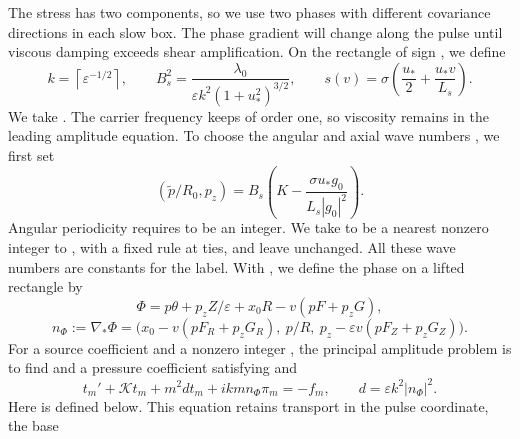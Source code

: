 The stress has two components, so we use two phases with different covariance directions
in each slow box. The phase gradient will change along the pulse until viscous damping
exceeds shear amplification. On the rectangle of sign , we define
\begin{equation}
k=\left\lceil\varepsilon^{-1/2}\right\rceil,\qquad
B_s^2=\frac{\lambda_0}{\varepsilon k^2(1+u_*^2)^{3/2}},\qquad
s(v)=\sigma\left(\frac{u_*}{2}+\frac{u_*v}{L_s}\right).
\tag{7.2}\label{eq:7.2}
\end{equation}
We take . The carrier frequency  keeps  of order one, so viscosity remains in the
leading amplitude equation. To choose the angular and axial wave numbers , we first set
\[
(\widetilde p/R_0,p_z)=B_s\left(K-\frac{\sigma u_*g_0}{L_s|g_0|^2}\right).
\]
Angular periodicity requires  to be an integer. We take  to be a nearest nonzero integer
to , with a fixed rule at ties, and leave  unchanged. All these wave numbers are constants
for the label. With , we define the phase on a lifted rectangle by
\begin{equation}
\Phi=p\theta+p_zZ/\varepsilon+x_0R-v(pF+p_zG),
\tag{7.3}\label{eq:7.3}
\end{equation}
\begin{equation}
n_\Phi:=\nabla_*\Phi=\bigl(x_0-v(pF_R+p_zG_R),\ p/R,\ p_z-\varepsilon v(pF_Z+p_zG_Z)\bigr).
\tag{7.4}\label{eq:7.4}
\end{equation}
For a source coefficient  and a nonzero integer , the principal amplitude problem
is to find  and a pressure coefficient  satisfying  and
\begin{equation}
t_m'+\mathcal Kt_m+m^2dt_m+ikmn_\Phi\pi_m=-f_m,
\qquad d=\varepsilon k^2|n_\Phi|^2.
\tag{7.5}\label{eq:7.5}
\end{equation}
Here  is defined below. This equation retains transport in the pulse coordinate, the base

